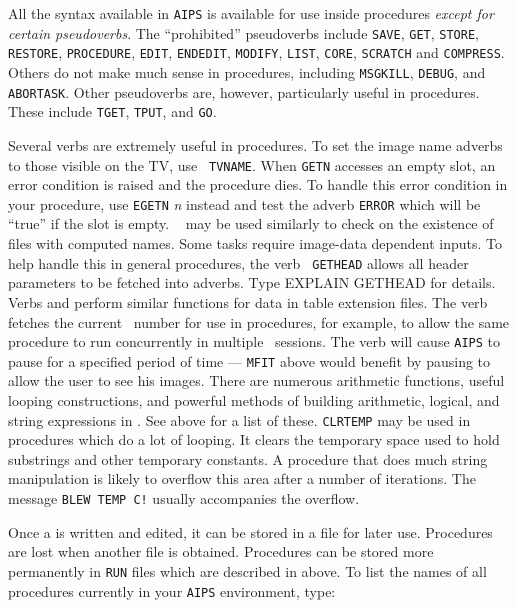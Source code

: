      All the syntax available in {\tt AIPS} is available for use
inside procedures {\it except for certain pseudoverbs}.  The
``prohibited'' pseudoverbs include {\tt SAVE}, {\tt GET}, {\tt STORE},
{\tt RESTORE}, {\tt PROCEDURE}, {\tt EDIT}, {\tt ENDEDIT}, {\tt MODIFY},
{\tt LIST}, {\tt CORE}, {\tt SCRATCH} and \hbox{{\tt COMPRESS}}.
Others do not make much sense in procedures, including {\tt MSGKILL},
{\tt DEBUG}, and \hbox{{\tt ABORTASK}}.  Other pseudoverbs are,
however, particularly useful in procedures.  These include {\tt TGET},
{\tt TPUT}, and \hbox{{\tt GO}}.

     Several verbs are extremely useful in procedures.  To set the
image name adverbs to those visible on the TV, use \hbox{{\tt
TVNAME}}.  When {\tt GETN} accesses an empty slot, an error condition
is raised and the procedure dies.  To handle this error condition in
your procedure, use {\tt EGETN} {\it n\/} instead and test the adverb
{\tt ERROR} which will be ``true'' if the slot is empty.  {\tt
{}} may be used similarly to check on the existence of
files with computed names.  Some tasks require image-data dependent
inputs.  To help handle this in general procedures, the verb {\tt
GETHEAD} allows all header parameters to be fetched into adverbs. Type
{\us EXPLAIN GETHEAD \CR} for details.  Verbs {\tt {}}
and {\tt {}} perform similar functions for data in table
extension files.  The verb {\tt {}} fetches the current
\POPS\ number for use in procedures, for example, to allow the same
procedure to run concurrently in multiple \AIPS\ sessions.   The verb
{\tt {}} will cause {\tt AIPS} to pause for a specified
period of time --- {\tt MFIT} above would benefit by pausing to allow
the user to see his images.  There are numerous arithmetic functions,
useful looping constructions, and powerful methods of building
arithmetic, logical, and string expressions in \hbox{\POPS}.  See
 above for a list of these. {\tt CLRTEMP} may be used in
procedures which do a lot of looping.  It clears the temporary space
used to hold substrings and other temporary constants. A procedure
that does much string manipulation is likely to overflow this area
after a number of iterations.  The message {\tt BLEW TEMP C!} usually
accompanies the overflow.

     Once a  is written and edited, it can be stored
in a {\tt {}} file for later use.  Procedures are lost when
another {\tt {}} file is obtained.  Procedures can be stored
more permanently in {\tt RUN} files which are described in
 above.  To list the names of all procedures currently in
your {\tt AIPS} environment, type:

